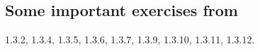 \subsection{Some important exercises from~\cite[\S1.3.7]{VianaOliveiraFoundErgTh}}
\label{sec:some-import-exerc-1.3.7}

1.3.2, 1.3.4, 1.3.5, 1.3.6, 1.3.7, 1.3.9, 1.3.10, 1.3.11, 1.3.12.
